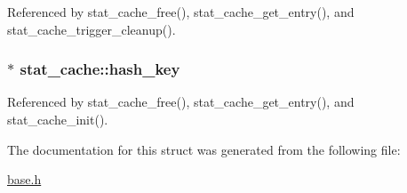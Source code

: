 Referenced by stat\-\_\-cache\-\_\-free(), stat\-\_\-cache\-\_\-get\-\_\-entry(), and stat\-\_\-cache\-\_\-trigger\-\_\-cleanup().

\hypertarget{structstat__cache_ae46bfe0e7f5cce4c62bd509f7d1c3b4b}{
\subsubsection[{hash\-\_\-key}]{$\ast$ stat\-\_\-cache\-::hash\-\_\-key}}\label{structstat__cache_ae46bfe0e7f5cce4c62bd509f7d1c3b4b}


Referenced by stat\-\_\-cache\-\_\-free(), stat\-\_\-cache\-\_\-get\-\_\-entry(), and stat\-\_\-cache\-\_\-init().



The documentation for this struct was generated from the following file\-:\begin{DoxyCompactItemize}
\item 
\hyperlink{base_8h}{base.\-h}\end{DoxyCompactItemize}

